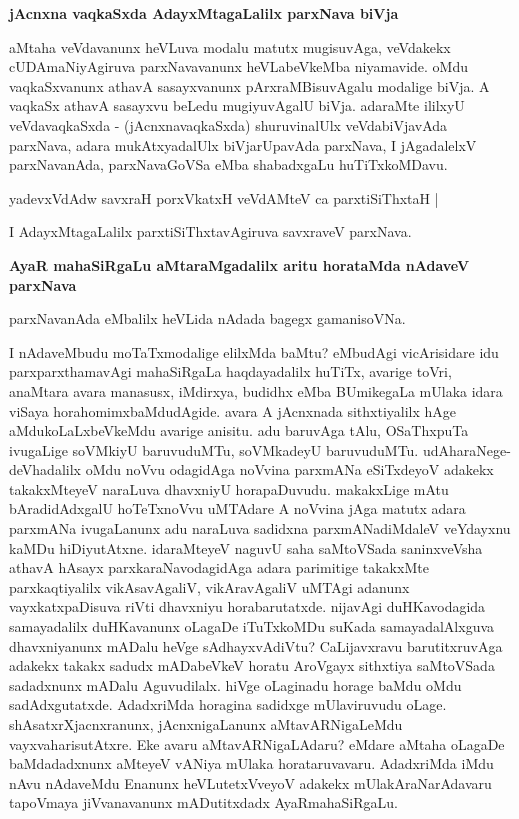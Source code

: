 {\bigskip
\noindent
{\large\bf jAcnxna vaqkaSxda AdayxMtagaLalilx parxNava biVja}}\label{page138}
\medskip

\noindent
aMtaha veVdavanunx heVLuva modalu matutx mugisuvAga, veVdakekx cUDA\-maNi\-yAgiruva parxNava\-vanunx heVLabeVkeMba niyamavide. oMdu vaqkaSxvanunx athavA sasayxvanunx pArxraMBisuvAgalu moda\-lige biVja. A vaqkaSx athavA sasayxvu beLedu mugiyuvAgalU biVja. adaraMte ililxyU veVdavaqkaSxda -\- (jAcnxnavaqkaSxda) shuruvinalUlx veVdabiVjavAda parxNava, adara mukAtxyadalUlx biVjarUpavAda parxNava, I jAgadalelxV parxNavanAda, parxNavaGoVSa eMba shabadxgaLu huTiTxkoMDavu.

\begin{shloka}
yadevxVdAdw savxraH porxVkatxH veVdAMteV ca parxtiSiThxtaH |\label{138}
\end{shloka}

\noindent
I AdayxMtagaLalilx parxtiSiThxtavAgiruva savxraveV parxNava.

{\bigskip
\noindent
{\large\bf AyaR mahaSiRgaLu aMtaraMgadalilx aritu horataMda nAdaveV parxNava}}\label{page138}
\medskip

\noindent
parxNavanAda eMbalilx heVLida nAdada bagegx gamanisoVNa.

I nAdaveMbudu moTaTxmodalige elilxMda baMtu? eMbudAgi vicArisidare idu parxparxthama\-vAgi mahaSiRgaLa haqdayadalilx huTiTx, avarige toVri, anaMtara avara manasusx, iMdirxya, budidhx eMba BUmike\-gaLa mUlaka idara viSaya horahomimxbaMdudAgide. avara A jAcnxnada sithxtiyalilx hAge aMdu\-koLaLxbeVkeMdu avarige anisitu. adu baruvAga tAlu, OSaThxpuTa ivugaLige soVMkiyU baruvu\-duMTu, soVMkadeyU baruvuduMTu. udAharaNege- deVhadalilx oMdu noVvu odagidAga noVvina parxmANa eSiTxdeyoV adakekx takakxMteyeV naraLuva dhavxniyU horapaDuvudu. makakxLige mAtu bAradi\-dAdxgalU hoTeTxnoVvu uMTAdare A noVvina jAga matutx adara parxmANa ivugaLanunx adu naraLuva sadidxna parxmANadiMdaleV veYdayxnu kaMDu hiDiyutAtxne. idaraMteyeV naguvU saha saMtoVSada saninxveVsha athavA hAsayx parxkaraNavodagidAga adara parimitige takakxMte parxkaqtiyalilx vikAsavAgaliV, vikAravAgaliV uMTAgi adanunx vayxkatxpaDisuva riVti dhavxniyu horabarutatxde. nijavAgi duHKavodagida samayadalilx duHKavanunx oLagaDe iTuTxkoMDu suKada samayadalAlxguva dhavxniyanunx mADalu heVge sAdhayxvAdiVtu? CaLijavxravu barutitxruvAga adakekx takakx sadudx mADabeVkeV horatu AroVgayx sithxtiya saMtoVSada sadadxnunx mADalu Aguvudilalx. hiVge oLaginadu horage baMdu oMdu sadAdxgutatxde. AdadxriMda horagina sadidxge mUlaviruvudu oLage. shAsatxrXjacnxranunx, jAcnxnigaLanunx aMtavARNigaLeMdu vayxvaharisutAtxre. Eke avaru aMtavARNigaLAdaru? eMdare aMtaha oLagaDe baMdadadxnunx aMteyeV vANiya mUlaka horataru\-vavaru. AdadxriMda iMdu nAvu nAdaveMdu Enanunx heVLutetxVveyoV adakekx mUlakAraNarAdavaru tapoVmaya jiVvanavanunx mADutitxdadx AyaRmahaSiRgaLu.

